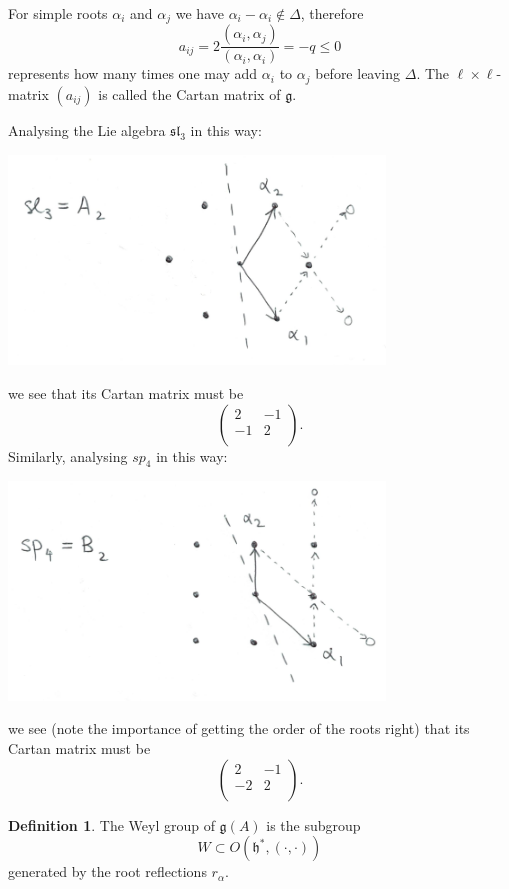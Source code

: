 \documentclass[12pt]{article}
\theoremstyle{plain}
\theoremstyle{definition}
\newtheorem{defn}{Definition}[section]
\numberwithin{equation}{section}
\newcommand{\al}{\alpha}
\newcommand{\la}{\lambda}
\newcommand{\D}{\Delta}
\newcommand{\g}{\mathfrak{g}}
\newcommand{\h}{\mathfrak{h}}
\newcommand{\sll}{\mathfrak{sl}}
\newcommand{\tbt}[4]{\left(\begin{array}{cc} #1 & #2 \\ #3 & #4 \\ \end{array}\right)}
\begin{document}
For simple roots $\alpha_i$ and $\alpha_j$ we have $\alpha_i - \alpha_i \notin \D$, therefore
\[
a_{ij} = 2 \frac{(\alpha_i, \alpha_j)}{(\alpha_i, \alpha_i)} = -q \leq 0
\]
represents how many times one may add $\alpha_i$ to $\alpha_j$ before leaving $\Delta$. The $\ell \times \ell$-matrix $(a_{ij})$ is called the Cartan matrix of $\g$.

Analysing the Lie algebra $\sll_3$ in this way:
\begin{center}
\includegraphics[width=100mm]{A2_Serre.png}
\end{center}
we see that its Cartan matrix must be
\[
\tbt{2}{-1}{-1}{2}.
\]
Similarly, analysing $sp_4$ in this way:
\begin{center}
\includegraphics[width=100mm]{B2_Serre.png}
\end{center}
we see (note the importance of getting the order of the roots right) that its Cartan matrix must be
\[
\tbt{2}{-1}{-2}{2}.
\]



\begin{defn}
The Weyl group of $\g(A)$ is the subgroup
\[
W \subset O(\h^*, (\cdot, \cdot))
\]
generated by the root reflections $r_\al$.
\end{defn}
\end{document}
